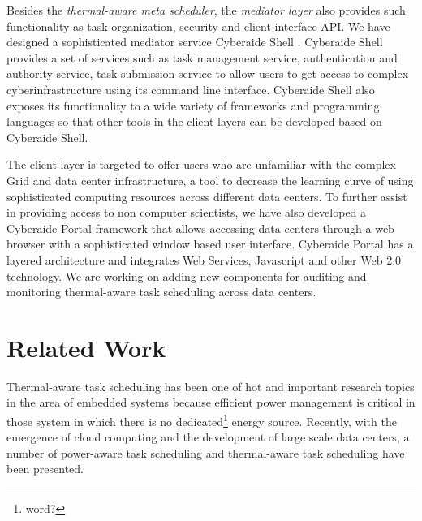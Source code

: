 Besides the {\em thermal-aware meta scheduler}, the {\em mediator layer} also provides such functionality as task organization, security and client interface API. We have designed a sophisticated mediator service Cyberaide Shell \cite{las09ccgrid}. %
 Cyberaide Shell provides a set of services such as task management service, authentication and authority service, task submission service to allow users to get access to complex cyberinfrastructure using its command line interface. Cyberaide Shell also exposes its functionality to a wide variety of frameworks and programming languages so that other tools in the client layers can be developed based on Cyberaide Shell.   
 
The client layer is targeted to offer users who are	 unfamiliar with the complex Grid and data center infrastructure, a tool to decrease the learning curve of using sophisticated computing resources across different data centers. 
To further assist in providing access to non computer scientists, we have also developed a Cyberaide Portal \cite{las08-javascript} framework that allows accessing data centers through a web browser with a sophisticated window based user interface.%
 Cyberaide Portal has a layered architecture and integrates Web Services, Javascript and other Web 2.0 technology. We are working on adding new components for auditing and monitoring thermal-aware task scheduling across data centers.



\section{Related Work}

Thermal-aware task scheduling \cite{DBLP:conf/dac/MukherjeeMM05, DBLP:conf/iccad/JayaseelanM08,DBLP:conf/date/CoskunRW07,DBLP:conf/vlsid/JayaseelanM09,arani2007ota,DBLP:conf/ispass/YangZCZJ08} has been one of hot and important research topics in the area of embedded systems because efficient power management is critical in those system in which there is no dedicated\footnote{word?} energy source.
Recently, with the emergence of cloud computing and the development of large scale data centers, a number of power-aware task scheduling \cite{DBLP:conf/ccgrid/KimBK07,DBLP:conf/sc/GeFC05} and thermal-aware task scheduling \cite{DBLP:conf/cluster/TangGV07,DBLP:conf/usenix/MooreCRS05,DBLP:conf/aPcsac/VandersterBD07} have been presented.

